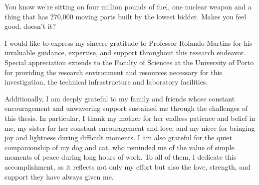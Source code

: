 
{
	You know we're sitting on four million pounds of fuel, one nuclear weapon and a thing that has 270,000 moving parts built by the lowest bidder. Makes you feel good, doesn't it?
}



\begin{acknowledgements}

\quad I would like to express my sincere gratitude to Professor Rolando Martins for his invaluable guidance, expertise, and support throughout this research endeavor. Special appreciation extends to the Faculty of Sciences at the University of Porto for providing the research environment and resources necessary for this investigation, the technical infrastructure and laboratory facilities.

\quad Additionally, I am deeply grateful to my family and friends whose constant encouragement and unwavering support sustained me through the challenges of this thesis. In particular, I thank my mother for her endless patience and belief in me, my sister for her constant encouragement and love, and my niece for bringing joy and lightness during difficult moments. I am also grateful for the quiet companionship of my dog and cat, who reminded me of the value of simple moments of peace during long hours of work. To all of them, I dedicate this accomplishment, as it reflects not only my effort but also the love, strength, and support they have always given me.

\end{acknowledgements}


